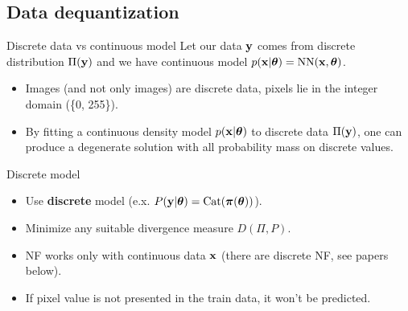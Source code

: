 \subsection{Data dequantization}
\begin{frame}{Discrete data vs continuous model}
	Let our data $\mathbf{y}$ comes from discrete distribution $\Pi(\mathbf{y})$ and we have continuous model $p(\mathbf{x} | \boldsymbol{\theta}) = \text{NN}(\mathbf{x}, \boldsymbol{\theta})$.
	\begin{itemize}
		\item Images {\color{gray}(and not only images)} are discrete data, pixels lie in the integer domain (\{0, 255\}). 
		\item By fitting a continuous density model $p(\mathbf{x} | \boldsymbol{\theta})$ to discrete data $\Pi(\mathbf{y})$, one can produce a degenerate solution with all probability mass on discrete values. 
	\end{itemize}
	\begin{block}{Discrete model}
		\begin{itemize}
			\item Use \textbf{discrete} model (e.x. $P(\mathbf{y} | \boldsymbol{\theta}) = \text{Cat}(\boldsymbol{\pi}(\boldsymbol{\theta}))$). 
			\item Minimize any suitable divergence measure $D(\Pi, P)$.
			\item NF works only with continuous data $\mathbf{x}$ (there are discrete NF, see papers below).
			\item If pixel value is not presented in the train data, it won't be predicted.		
		\end{itemize}
	\end{block}
\end{frame}
